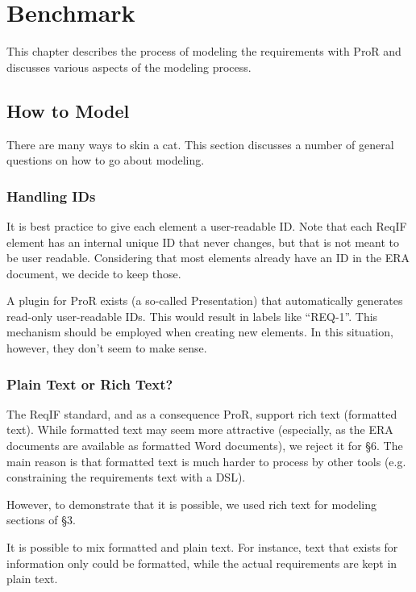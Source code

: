 \documentclass{template/openetcs_report}
\begin{document}
\chapter{Benchmark}

This chapter describes the process of modeling the requirements with ProR and discusses various aspects of the modeling process.

\section{How to Model}

There are many ways to skin a cat.  This section discusses a number of general questions on how to go about modeling.

\subsection{Handling IDs}

It is best practice to give each element a user-readable ID.  Note that each ReqIF element has an internal unique ID that never changes, but that is not meant to be user readable.  Considering that most elements already have an ID in the ERA document, we decide to keep those.

A plugin for ProR exists (a so-called Presentation) that automatically generates read-only user-readable IDs.  This would result in labels like ``REQ-1''.  This mechanism should be employed when creating new elements.  In this situation, however, they don't seem to make sense.

\subsection{Plain Text or Rich Text?}

The ReqIF standard, and as a consequence ProR, support rich text (formatted text).  While formatted text may seem more attractive (especially, as the ERA documents are available as formatted Word documents), we reject it for §6.  The main reason is that formatted text is much harder to process by other tools (e.g. constraining the requirements text with a DSL).

However, to demonstrate that it is possible, we used rich text for modeling sections of §3.

It is possible to mix formatted and plain text.  For instance, text that exists for information only could be formatted, while the actual requirements are kept in plain text.
\end{document}
